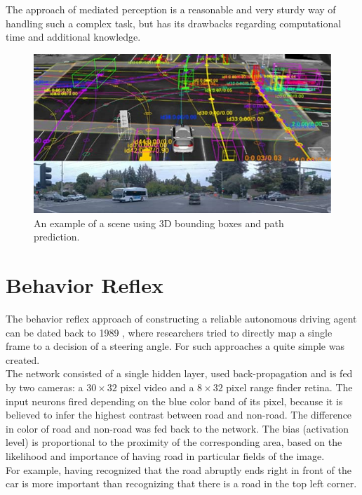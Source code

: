 The approach of mediated perception is a reasonable and very sturdy way of handling such a complex task, but has its drawbacks regarding computational time and additional knowledge.

\begin{figure}
	\centering
	\includegraphics[scale=0.7]{src/pic/intersection.png}
	\caption{An example of a scene using 3D bounding boxes and path prediction.}
	\label{pic: 3D Bounding Box}
\end{figure}

\section{Behavior Reflex}\label{sec: Behavior Reflex}

The behavior reflex approach of constructing a reliable autonomous driving agent can be dated back to 1989 , where researchers tried to directly map a single frame to a decision of a steering angle. For such approaches a quite simple \nn was created. \\
The network \alvinn consisted of a single hidden layer, used back-propagation and is fed by two cameras: a $30\times32$ pixel video and a $8\times32$ pixel range finder retina. The input neurons fired depending on the blue color band of its pixel, because it is believed to infer the highest contrast between road and non-road. The difference in color of road and non-road was fed back to the network. The bias (activation level) is proportional to the proximity of the corresponding area, based on the likelihood and importance of having road in particular fields of the image.\cite{pomerleau1989alvinn}\\
For example, having recognized that the road abruptly ends right in front of the car is more important than recognizing that there is a road in the top left corner.\\

